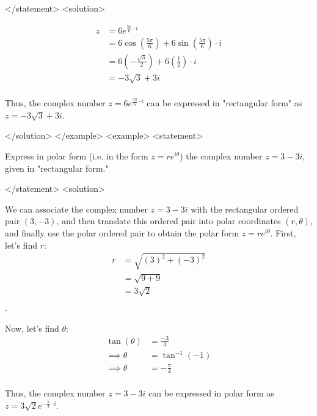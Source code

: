       </statement>
      <solution>
        
            \begin{align*}
              z &=6e^{\frac{5\pi}{6}\cdot i} \\
               &=6\cos\left( \frac{5\pi}{6} \right)+6\sin \left( \frac{5\pi}{6} \right)\cdot i \\
               &=6 \left(-\frac{\sqrt{3}}{2} \right)+6 \left( \frac{1}{2} \right)\cdot i \\
               &=-3\sqrt{3}+3i \\
            \end{align*}
        
        
          Thus, the complex number $z=6e^{\frac{5\pi}{6}\cdot i}$ can be expressed in "rectangular form" as $z=-3\sqrt{3}+3i$.
        
      </solution>
    </example>
    <example>
      <statement>
        
          Express in polar form (i.e. in the form $z=re^{i\theta}$) the complex number $z=3-3i$, given in "rectangular form."
        
      </statement>
      <solution>
        
          We can associate the complex number $z=3-3i$ with the rectangular ordered pair $(3,-3)$, and then translate this ordered pair into polar coordinates $(r,\theta)$, and finally use the polar ordered pair to obtain the polar form $z=re^{i\theta}$. First, let's find $r$:
            \begin{align*}
              r &= \sqrt{(3)^2+(-3)^2} \\
               &= \sqrt{9+9} \\
               &=3\sqrt{2} \\
            \end{align*}.
        
        
          Now, let's find $\theta$:
            \begin{align*}
              \tan(\theta) &=\frac{-3}{3} \\
               \implies \theta &=\tan^{-1}(-1) \\
               \implies \theta &=-\frac{\pi}{4} \\
            \end{align*}
        
        
          Thus, the complex number $z=3-3i$ can be expressed in polar form as $z=3\sqrt{2}e^{-\frac{\pi}{4} \cdot i}$.
        
